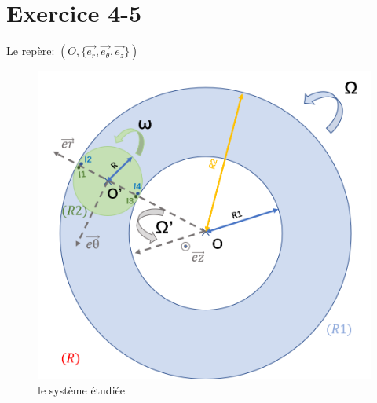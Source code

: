 \documentclass[a4paper,12pt]{book}
\begin{document}
\section{Exercice 4-5}
Le repère: $(O,\{\vec{e_r},\vec{e_\theta},\vec{e_z}\})$
\begin{figure}[h]
    \begin{center}
    \includegraphics[scale=0.6]{meca42.png}
    \end{center}
    \caption{le système étudiée}
\end{figure}
\end{document}
